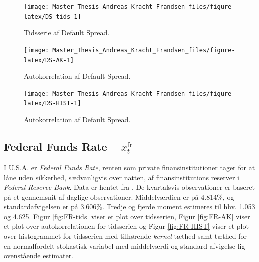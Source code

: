 \documentclass[
  a4paper,
  oneside]{memoir}
\begin{document}
\begin{figure}[htbp!]

{\centering \texttt{[image: Master\_Thesis\_Andreas\_Kracht\_Frandsen\_files/figure-latex/DS-tids-1]} 

}

\caption{Tidsserie af Default Spread.}\label{fig:DS-tids}
\end{figure}

\begin{figure}[htbp!]

{\centering \texttt{[image: Master\_Thesis\_Andreas\_Kracht\_Frandsen\_files/figure-latex/DS-AK-1]} 

}

\caption{Autokorrelation af Default Spread.}\label{fig:DS-AK}
\end{figure}

\begin{figure}[htbp!]

{\centering \texttt{[image: Master\_Thesis\_Andreas\_Kracht\_Frandsen\_files/figure-latex/DS-HIST-1]} 

}

\caption{Autokorrelation af Default Spread.}\label{fig:DS-HIST}
\end{figure}

\hypertarget{federal-funds-rate-x_ttextfr}{%
\subsection{\texorpdfstring{Federal Funds Rate -- \(x_t^{\text{fr}}\)}{Federal Funds Rate -- x\_t\^{}\{\textbackslash text\{fr\}\}}}\label{federal-funds-rate-x_ttextfr}}

I U.S.A. er \emph{Federal Funds Rate}, renten som private finansinstitutioner tager for at låne uden sikkerhed, sædvanligvis over natten, af finansinstitutions reserver i \emph{Federal Reserve Bank}. Data er hentet fra \citep{FREDF2020}. De kvartalsvis observationer er baseret på et gennemsnit af daglige observationer. Middelværdien er på 4.814\(\%\), og standardafvigelsen er på 3.606\(\%\). Tredje og fjerde moment estimeres til hhv. 1.053 og 4.625. Figur \ref{fig:FR-tids} viser et plot over tidsserien, Figur \ref{fig:FR-AK} viser et plot over autokorrelationen for tidsserien og Figur \ref{fig:FR-HIST} viser et plot over histogrammet for tidsserien med tilhørende \emph{kernel} tæthed samt tæthed for en normalfordelt stokastisk variabel med middelværdi og standard afvigelse lig ovenstående estimater.
\end{document}

